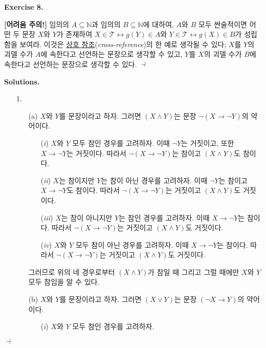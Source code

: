 \documentclass[12pt]{paper}
\newenvironment{context}[1][]
{ \noindent \textbf{{#1}.}
}
{ \hfill $ \dashv $ }
\begin{document}
\begin{context}[Exercise 8]
\textbf{[어려움 주의!]} 임의의 $A \subseteq \mathbb{N}$과 임의의 $B \subseteq \mathbb{N}$에 대하여,
$A$와 $B$ 모두 싼술적이면 어떤 두 문장 $X$와 $Y$가 존재하여 $X \in \mathcal{T} \leftrightarrow g \left( Y \right) \in A$와 $Y \in \mathcal{T} \leftrightarrow g \left( X \right) \in B$가 성립함을 보여라.
이것은 \underline{상호 참조}(\textit{cross-reference})의 한 예로 생각될 수 있다;
$X$를 $Y$의 괴델 수가 $A$에 속한다고 선언하는 문장으로 생각할 수 있고,
$Y$를 $X$의 괴델 수가 $B$에 속한다고 선언하는 문장으로 생각할 수 있다.
\end{context}

\begin{context}[Solutions]
\begin{enumerate}
\item[{1.}]
\begin{itemize}
\item[(a)] $X$와 $Y$를 문장이라고 하자.
그러면 $\left( X \land Y \right)$는 문장 $\lnot \left( X \rightarrow \lnot Y \right)$의 약어이다.
\begin{enumerate}
\item[(\textit{i})] $X$와 $Y$ 모두 참인 경우를 고려하자.
이때 $\lnot Y$는 거짓이고, 또한 $X \rightarrow \lnot Y$는 거짓이다.
따라서 $\lnot \left( X \rightarrow \lnot Y \right)$는 참이고 $\left( X \land Y \right)$도 참이다.
\item[(\textit{ii})] $X$는 참이지만 $Y$는 참이 아닌 경우를 고려하자.
이때 $\lnot Y$는 참이고 $X \rightarrow \lnot Y$도 참이다.
따라서 $\lnot \left( X \rightarrow \lnot Y \right)$는 거짓이고 $\left( X \land Y \right)$도 거짓이다.
\item[(\textit{iii})] $X$는 참이 아니지만 $Y$는 참인 경우를 고려하자.
이때 $X \rightarrow \lnot Y$는 참이다.
따라서 $\lnot \left( X \rightarrow \lnot Y \right)$는 거짓이고 $\left( X \land Y \right)$도 거짓이다.
\item[(\textit{iv})] $X$와 $Y$ 모두 참이 아닌 경우를 고려하자.
이때 $X \rightarrow \lnot Y$는 참이다.
따라서 $\lnot \left( X \rightarrow \lnot Y \right)$는 거짓이고 $\left( X \land Y \right)$도 거짓이다.
\end{enumerate}
그러므로 위의 네 경우로부터 $\left( X \land Y \right)$가 참일 때 그리고 그럴 때에만 $X$와 $Y$ 모두 참임을 알 수 있다.
\item[(b)] $X$와 $Y$를 문장이라고 하자.
그러면 $\left( X \lor Y \right)$는 문장 $\left( \lnot X \rightarrow Y \right)$의 약어이다.
\begin{enumerate}
\item[(\textit{i})] $X$와 $Y$ 모두 참인 경우를 고려하자.

\end{enumerate}
\end{itemize}
\end{enumerate}
\end{context}
\end{document}
